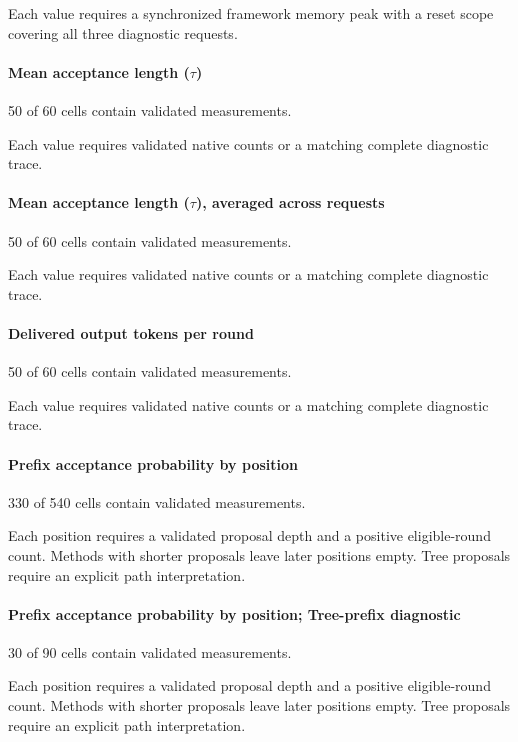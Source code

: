 Each value requires a synchronized framework memory peak with a reset scope covering all three diagnostic requests.

\paragraph*{Mean acceptance length (\(\tau\))}

50 of 60 cells contain validated measurements.

Each value requires validated native counts or a matching complete diagnostic trace.

\paragraph*{Mean acceptance length (\(\tau\)), averaged across requests}

50 of 60 cells contain validated measurements.

Each value requires validated native counts or a matching complete diagnostic trace.

\paragraph*{Delivered output tokens per round}

50 of 60 cells contain validated measurements.

Each value requires validated native counts or a matching complete diagnostic trace.

\paragraph*{Prefix acceptance probability by position}

330 of 540 cells contain validated measurements.

Each position requires a validated proposal depth and a positive eligible-round count. Methods with shorter proposals leave later positions empty. Tree proposals require an explicit path interpretation.

\paragraph*{Prefix acceptance probability by position; Tree-prefix diagnostic}

30 of 90 cells contain validated measurements.

Each position requires a validated proposal depth and a positive eligible-round count. Methods with shorter proposals leave later positions empty. Tree proposals require an explicit path interpretation.

